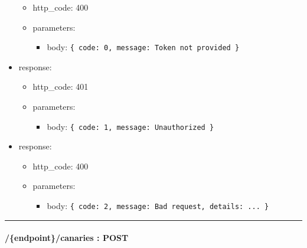 \documentclass[
]{article}
\begin{document}
\begin{itemize}
  \begin{itemize}
  \item
    http\_code: 400
  \item
    parameters:

    \begin{itemize}
    \item
      body: \texttt{\{
      \textquotesingle{}code\textquotesingle{}:\ 0,\ 
      \textquotesingle{}message\textquotesingle{}:\ \textquotesingle{}Token\ not\ provided\textquotesingle{}
      \}}
    \end{itemize}
  \end{itemize}
\item
  response:

  \begin{itemize}
  \item
    http\_code: 401
  \item
    parameters:

    \begin{itemize}
    \item
      body: \texttt{\{
      \textquotesingle{}code\textquotesingle{}:\ 1,\ 
      \textquotesingle{}message\textquotesingle{}:\ \textquotesingle{}Unauthorized\textquotesingle{}
      \}}
    \end{itemize}
  \end{itemize}
\item
  response:

  \begin{itemize}
  \item
    http\_code: 400
  \item
    parameters:

    \begin{itemize}
    \item
      body: \texttt{\{
      \textquotesingle{}code\textquotesingle{}:\ 2,
      \textquotesingle{}message\textquotesingle{}:\ \textquotesingle{}Bad\ request\textquotesingle{},
      \textquotesingle{}details\textquotesingle{}:\ \textquotesingle{}...\textquotesingle{}
      \}}
    \end{itemize}
  \end{itemize}
\end{itemize}

\begin{center}\rule{0.5\linewidth}{0.5pt}\end{center}

\hypertarget{header-n61542}{%
\paragraph{/\{endpoint\}/canaries : POST}\label{header-n61542}}
\end{document}
